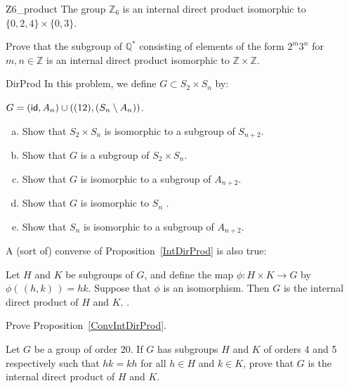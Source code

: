  
\begin{example}{Z6_product}
The group ${\mathbb Z}_6$ is an internal direct product isomorphic to $\{
0, 2, 4\} \times \{ 0, 3 \}$. 
\end{example}

\begin{exercise}{}
Prove that the subgroup of ${\mathbb Q}^\ast$ consisting of elements of
the form $2^m 3^n$ for $m,n \in {\mathbb Z}$ is an internal direct
product isomorphic to ${\mathbb Z} \times {\mathbb Z}$.
 \end{exercise}

\begin{exercise}{DirProd}
In this problem, we define  $G \subset S_2  \times S_n$ by:
\noindent

$G = ({\sf{i}d} , A_n) \cup ( (12) , (S_n \setminus  A_n))$.
\begin{enumerate}[(a)]
\item
Show that $S_2  \times S_n $ is isomorphic to a subgroup of $S_{n+2}$.  
\item
 Show that $G$  is  a subgroup of $S_2  \times S_n $.
\item
Show that $G$ is isomorphic to a subgroup of $A_{n+2}$.
\item
Show that $G$ is isomorphic to $S_n$ .
\item
Show that $S_n$ is isomorphic to a subgroup of $A_{n+2}$.  
\end{enumerate}
\end{exercise}

A (sort of) converse of Proposition~\ref{IntDirProd} is also true:

\begin{thm}\label{ConvIntDirProd}
Let $H$ and $K$ be subgroups of $G$, and define the map $\phi:H \times K \rightarrow G$  by $\phi(\, (h,k)\,) = hk$.  Suppose that $\phi$ is an isomorphism.  Then $G$ is the internal direct product of  $H$ and $K$.
.\end{thm}

\begin{exercise}{}
Prove Proposition~\ref{ConvIntDirProd}.
\end{exercise}

\begin{exercise}{}
Let $G$ be a group of order 20. If $G$ has subgroups $H$ and $K$ of
orders 4 and 5 respectively such that $hk = kh$ for all $h \in H$ and
$k \in K$, prove that $G$ is the internal direct product of $H$ and $K$. 
 \end{exercise}

